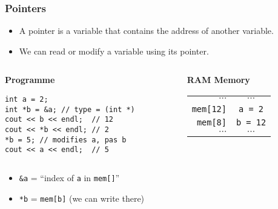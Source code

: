 \documentclass[12pt]{beamer}
\begin{document}
\begin{frame}[fragile]
\frametitle{Pointers}
\begin{itemize}
\item A pointer is a variable that contains the address of another variable.
\item We can read or modify a variable using its pointer.
\end{itemize}
\vspace{6pt}
\begin{columns}[T]
\begin{column}{.6\textwidth}
\textbf{Programme}
\begin{lstlisting}
int a = 2;
int *b = &a; // type = (int *)
cout << b << endl;  // 12
cout << *b << endl; // 2
*b = 5; // modifies a, pas b
cout << a << endl;  // 5
\end{lstlisting}
\end{column}
\begin{column}{.3\textwidth}
\textbf{RAM Memory}
\vspace{7pt}

\begin{tabu}{r|c|}
$\cdots$ & $\cdots$ \\
\lstinline|mem[12]| & \lstinline|a = 2| \\
\lstinline|mem[8]| & \lstinline|b = 12| \\
$\cdots$ & $\cdots$
\end{tabu}
\end{column}
\end{columns}
\vspace{3pt}
\begin{itemize}
\item \lstinline|&a| = ``index of \lstinline|a| in \lstinline|mem[]|''
\item \lstinline|*b| = \lstinline|mem[b]| (we can write there)
\end{itemize}
\end{frame}
\end{document}
